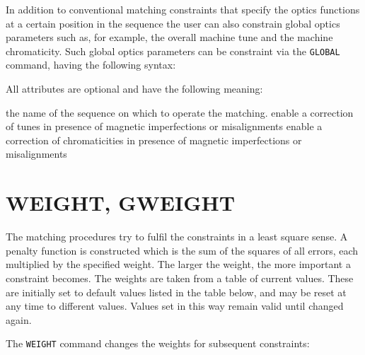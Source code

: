 In addition to conventional matching constraints that specify the optics 
functions at a certain position in the sequence the user can also constrain 
global optics parameters such as, for example, the overall machine tune
and the machine chromaticity. Such global optics parameters can be
constraint via the \texttt{GLOBAL} command, having the following syntax:



All attributes are optional and have the following meaning:
\begin{madlist}
   the name of the sequence on which to operate the matching.
   enable a correction of tunes in presence of
  magnetic imperfections or misalignments
  enable a correction of chromaticities in presence of
  magnetic imperfections or misalignments
\end{madlist}


\section{WEIGHT, GWEIGHT}
\label{sec:weight}\label{sec:gweight}

The matching procedures try to fulfil the constraints
in a least square sense.
A penalty function is constructed which is the sum of the
squares of all errors, each multiplied by the specified weight.
The larger the weight, the more important a constraint becomes.
The weights are taken from a table of current values.
These are initially set to default values listed in the table below,
and may be reset at any time to different values.
Values set in this way remain valid until changed again.

The \texttt{WEIGHT} command changes the weights for subsequent
constraints: 

